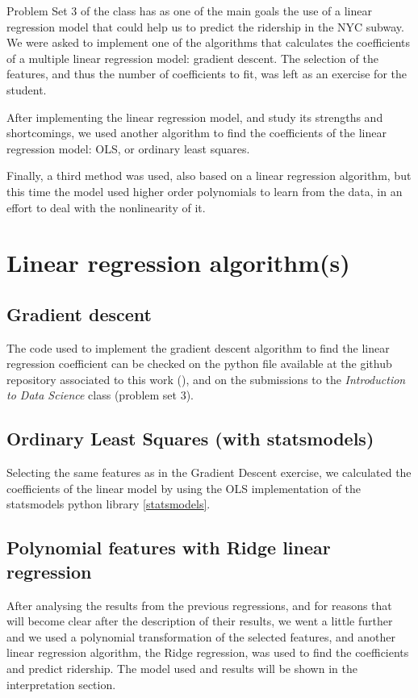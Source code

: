 \documentclass[a4paper,12pt,english]{sphinxmanual}
\begin{document}
Problem Set 3 of the class has as one of the main goals the use of a linear
regression model that could help us to predict the ridership in the NYC subway.
We were asked to implement one of the algorithms that calculates the
coefficients of a multiple linear regression model: gradient descent. The
selection of the features, and thus the number of coefficients to fit, was left
as an exercise for the student.

After implementing the linear regression model, and study its strengths and
shortcomings, we used another algorithm to find the coefficients of the linear
regression model: OLS, or ordinary least squares.

Finally, a third method was used, also based on a linear regression algorithm,
but this time the model used higher order polynomials to learn from the data,
in an effort to deal with the nonlinearity of it.


\section{Linear regression algorithm(s)}
\label{section2:linear-regression-algorithm-s}

\subsection{Gradient descent}
\label{section2:gradient-descent}
The code used to implement the gradient descent algorithm to find the linear
regression coefficient can be checked on the python file available at the
github repository associated to this work (), and on the
submissions to the \emph{Introduction to Data Science} class (problem set 3).


\subsection{Ordinary Least Squares (with statsmodels)}
\label{section2:ordinary-least-squares-with-statsmodels}
Selecting the same features as in the Gradient Descent exercise, we calculated
the coefficients of the linear model by using the OLS implementation of the
statsmodels python library {\hyperref[overview:statsmodels]{{[}statsmodels{]}}}.


\subsection{Polynomial features with Ridge linear regression}
\label{section2:polynomial-features-with-ridge-linear-regression}
After analysing the results from the previous regressions, and for reasons that
will become clear after the description of their results, we went a little
further and we used a polynomial transformation of the selected features, and
another linear regression algorithm, the Ridge regression, was used to find the
coefficients and predict ridership. The model used and results will be shown in
the interpretation section.
\end{document}
